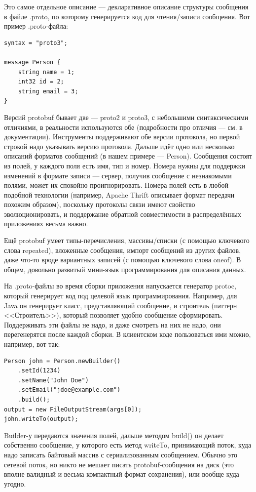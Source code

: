 \documentclass{../../text-style}
\begin{document}
Это самое отдельное описание --- декларативное описание структуры сообщения в файле .proto, по которому генерируется код для чтения/записи сообщения. Вот пример .proto-файла:

\begin{verbatim}
syntax = "proto3";

message Person {
    string name = 1;
    int32 id = 2;
    string email = 3;
}
\end{verbatim}

Версий protobuf бывает две --- proto2 и proto3, с небольшими синтаксическими отличиями, в реальности используются обе (подробности про отличия --- см. в документации). Инструменты поддерживают обе версии протокола, но первой строкой надо указывать версию протокола. Дальше идёт одно или несколько описаний форматов сообщений (в нашем примере --- Person). Сообщения состоят из полей, у каждого поля есть имя, тип и номер. Номера нужны для поддержки изменений в формате записи --- сервер, получив сообщение с незнакомыми полями, может их спокойно проигнорировать. Номера полей есть в любой подобной технологии (например, Apache Thrift описывает формат передачи похожим образом), поскольку протоколы связи имеют свойство эволюционировать, и поддержание обратной совместимости в распределённых приложениях весьма важно.

Ещё protobuf умеет типы-перечисления, массивы/списки (с помощью ключевого слова repeated), вложенные сообщения, импорт сообщений из других файлов, даже что-то вроде вариантных записей (с помощью ключевого слова oneof). В общем, довольно развитый мини-язык программирования для описания данных.

На .proto-файлы во время сборки приложения напускается генератор protoc, который генерирует код под целевой язык программирования. Например, для Java он генерирует класс, представляющий сообщение, и строитель (паттерн <<Строитель>>), который позволяет удобно сообщение сформировать. Поддерживать эти файлы не надо, и даже смотреть на них не надо, они перегенерятся после каждой сборки. В клиентском коде пользоваться ими можно, например, вот так:

\begin{verbatim}
Person john = Person.newBuilder()
    .setId(1234)
    .setName("John Doe")
    .setEmail("jdoe@example.com")
    .build();
output = new FileOutputStream(args[0]);
john.writeTo(output);
\end{verbatim}

Builder-у передаются значения полей, дальше методом build() он делает собственно сообщение, у которого есть метод writeTo, принимающий поток, куда надо записать байтовый массив с сериализованным сообщением. Обычно это сетевой поток, но никто не мешает писать protobuf-сообщения на диск (это вполне валидный и весьма компактный формат сохранения), или вообще куда угодно.
\end{document}
